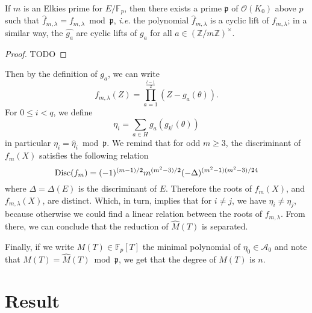 \documentclass[a4paper]{article} %
\newcommand\zmodninv[1]{(\mathbb{Z}/#1\mathbb{Z})^{\times}}
\newcommand\GF[1]{\mathbb{F}_{#1}}
\newcommand\EO{\mathcal{O}}
\begin{document}
\begin{fac}
If $m$ is an Elkies prime for $E/\GF{p}$, then there exists a prime $\mathfrak{p}$ of
$\EO(K_0)$ above $p$ such that 
$\widehat{f}_{m,\lambda}=f_{m,\lambda}\bmod\mathfrak{p}$, \emph{i.e.} the 
polynomial $\widehat{f}_{m,\lambda}$ is a cyclic lift of $f_{m,\lambda}$; in a 
similar way, the $\widehat{g_a}$ are cyclic lifts of $g_a$ for all 
$a\in\zmodninv{m}$.
\end{fac}
\begin{proof}
TODO
\end{proof}
Then by the definition of $g_a$, we can write 
\begin{equation}
f_{m,\lambda}(Z) = \prod_{a=1}^{\tfrac{l-1}{2}}{(Z - g_a(\theta))}.
\end{equation}
For $0 \leq i < q$, we define 
\begin{equation}
\eta_i = \sum_{a\in H}{g_a(g_{k^i}(\theta))}
\end{equation}
in particular $\eta_i = \widehat{\eta}_i \bmod \mathfrak{p}$. We remind that for
odd $m\geq3$, the discriminant of $f_m(X)$ satisfies the following relation
\begin{equation}
\textup{Disc}(f_m) = (-1)^{(m-1)/2}m^{(m^2 - 3)/2}(-\Delta)^{(m^2 - 1)(m^2 -
3)/24}
\end{equation}
where $\Delta = \Delta(E)$ is the discriminant of $E$. Therefore the roots of
$f_m(X)$, and $f_{m,\lambda}(X)$, are distinct. Which, in turn,
implies that for $i\neq j$, we have $\eta_i\neq\eta_j$, because otherwise we 
could find a linear relation between the roots of $f_{m,\lambda}$. From there, 
we can conclude that the reduction of $\widehat{M}(T)$ is separated.\par
Finally, if we write $M(T)\in\GF{p}[T]$ the minimal polynomial of
$\eta_0\in\mathcal{A}_0$ and note that $M(T) = \widehat{M}(T)\bmod
\mathfrak{p}$, we get that the degree of $M(T)$ is $n$.

\section{Result}
\end{document}
